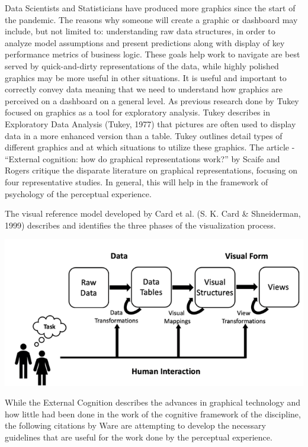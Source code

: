 \documentclass[print]{nuthesis}
\begin{document}
Data Scientists and Statisticians have produced more graphics since the start of the pandemic. The reasons why someone will create a graphic or dashboard may include, but not limited to: understanding raw data structures, in order to analyze model assumptions and present predictions along with display of key performance metrics of business logic. These goals help work to navigate are best served by quick-and-dirty representations of the data, while highly polished graphics may be more useful in other situations. It is useful and important to correctly convey data meaning that we need to understand how graphics are perceived on a dashboard on a general level. As previous research done by Tukey focused on graphics as a tool for exploratory analysis. Tukey describes in Exploratory Data Analysis (Tukey, 1977) that pictures are often used to display data in a more enhanced version than a table. Tukey outlines detail types of different graphics and at which situations to utilize these graphics. The article - ``External cognition: how do graphical representations work?'' by Scaife and Rogers critique the disparate literature on graphical representations, focusing on four representative studies. In general, this will help in the framework of psychology of the perceptual experience.

The visual reference model developed by Card et al. (S. K. Card \& Shneiderman, 1999) describes and identifies the three phases of the visualization process.

\includegraphics[width=\textwidth]{figure/VizModelDiagram}

While the External Cognition describes the advances in graphical technology and how little had been done in the work of the cognitive framework of the discipline, the following citations by Ware are attempting to develop the necessary guidelines that are useful for the work done by the perceptual experience.
\end{document}
